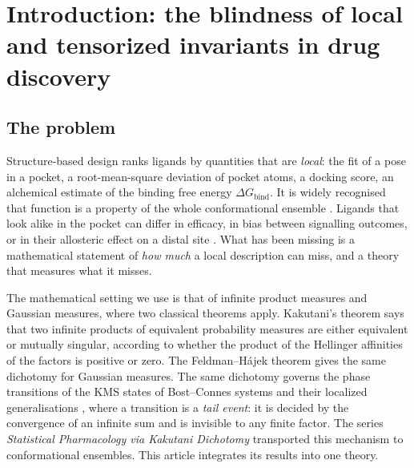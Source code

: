 \documentclass[11pt,reqno]{amsart}
\theoremstyle{plain}
\theoremstyle{definition}
\theoremstyle{remark}
\numberwithin{equation}{section}
\begin{document}
\maketitle
\tableofcontents

\section{Introduction: the blindness of local and tensorized invariants in drug discovery}
\label{sec:intro}

\subsection*{The problem}
Structure-based design ranks ligands by quantities that are \emph{local}: the fit of a pose in a pocket, a root-mean-square deviation of pocket atoms, a docking score, an alchemical estimate of the binding free energy $\Delta G_{\mathrm{bind}}$. It is widely recognised that function is a property of the whole conformational ensemble \cite{MWC1965,Motlagh2014}. Ligands that look alike in the pocket can differ in efficacy, in bias between signalling outcomes, or in their allosteric effect on a distal site \cite{Bowman2012,Motlagh2014}. What has been missing is a mathematical statement of \emph{how much} a local description can miss, and a theory that measures what it misses.

The mathematical setting we use is that of infinite product measures and Gaussian measures, where two classical theorems apply. Kakutani's theorem \cite{Kakutani1948} says that two infinite products of equivalent probability measures are either equivalent or mutually singular, according to whether the product of the Hellinger affinities of the factors is positive or zero. The Feldman--H\'ajek theorem \cite{Feldman1958,Hajek1958} gives the same dichotomy for Gaussian measures. The same dichotomy governs the phase transitions of the KMS states of Bost--Connes systems and their localized generalisations \cite{BostConnes1995,Chen2026}, where a transition is a \emph{tail event}: it is decided by the convergence of an infinite sum and is invisible to any finite factor. The series \emph{Statistical Pharmacology via Kakutani Dichotomy} \cite{ChenChen2026I,ChenChen2026II,ChenChen2026III,ChenChen2026IV,ChenChen2026V,ChenChen2026VI,ChenChen2026VII} transported this mechanism to conformational ensembles. This article integrates its results into one theory.
\end{document}

